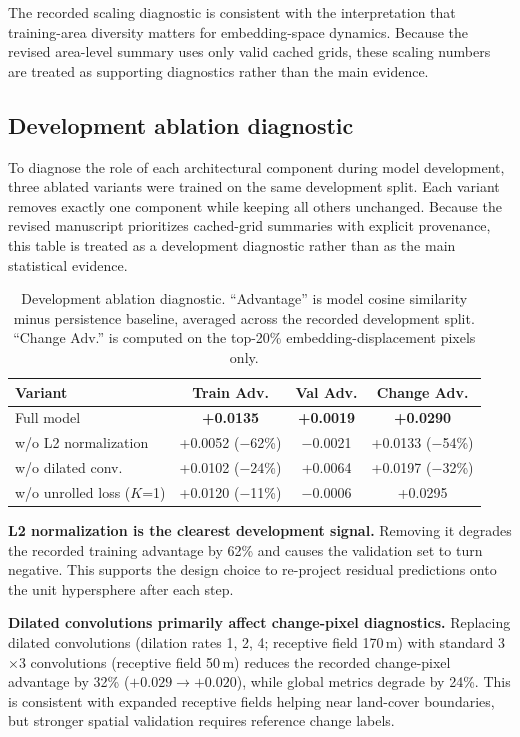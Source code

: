 \documentclass{article}
\begin{document}
The recorded scaling diagnostic is consistent with the interpretation that training-area diversity matters for embedding-space dynamics. Because the revised area-level summary uses only valid cached grids, these scaling numbers are treated as supporting diagnostics rather than the main evidence.

\subsection{Development ablation diagnostic}
\label{sec:ablation}

To diagnose the role of each architectural component during model development, three ablated variants were trained on the same development split. Each variant removes exactly one component while keeping all others unchanged. Because the revised manuscript prioritizes cached-grid summaries with explicit provenance, this table is treated as a development diagnostic rather than as the main statistical evidence.

\begin{table}[htbp]
\centering
\caption{Development ablation diagnostic. ``Advantage'' is model cosine similarity minus persistence baseline, averaged across the recorded development split. ``Change Adv.'' is computed on the top-20\% embedding-displacement pixels only.}
\label{tab:ablation}
\begin{tabular}{lccc}
\toprule
Variant & Train Adv. & Val Adv. & Change Adv. \\
\midrule
Full model & \textbf{+0.0135} & \textbf{+0.0019} & \textbf{+0.0290} \\
w/o L2 normalization & +0.0052 ($-$62\%) & $-$0.0021 & +0.0133 ($-$54\%) \\
w/o dilated conv. & +0.0102 ($-$24\%) & +0.0064 & +0.0197 ($-$32\%) \\
w/o unrolled loss ($K$=1) & +0.0120 ($-$11\%) & $-$0.0006 & +0.0295 \\
\bottomrule
\end{tabular}
\end{table}

\textbf{L2 normalization is the clearest development signal.} Removing it degrades the recorded training advantage by 62\% and causes the validation set to turn negative. This supports the design choice to re-project residual predictions onto the unit hypersphere after each step.

\textbf{Dilated convolutions primarily affect change-pixel diagnostics.} Replacing dilated convolutions (dilation rates 1, 2, 4; receptive field 170\,m) with standard 3$\times$3 convolutions (receptive field 50\,m) reduces the recorded change-pixel advantage by 32\% ($+0.029 \to +0.020$), while global metrics degrade by 24\%. This is consistent with expanded receptive fields helping near land-cover boundaries, but stronger spatial validation requires reference change labels.
\end{document}
